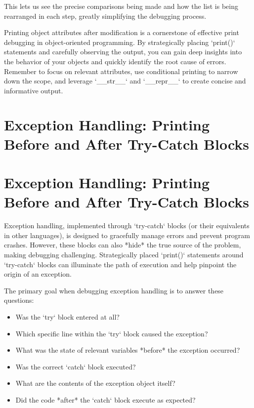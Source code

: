 \documentclass{article}
\begin{document}
{{{This lets us see the precise comparisons being made and how the list is being rearranged in each step, greatly simplifying the debugging process.

Printing object attributes after modification is a cornerstone of effective print debugging in object-oriented programming. By strategically placing `print()` statements and carefully observing the output, you can gain deep insights into the behavior of your objects and quickly identify the root cause of errors. Remember to focus on relevant attributes, use conditional printing to narrow down the scope, and leverage `__str__` and `__repr__` to create concise and informative output.

\newpage

\section*{Exception Handling: Printing Before and After Try-Catch Blocks} %
\label{chapter-3-5-Exception_Handling__Printing_Before_and}

\section*{Exception Handling: Printing Before and After Try-Catch Blocks}

Exception handling, implemented through `try-catch` blocks (or their equivalents in other languages), is designed to gracefully manage errors and prevent program crashes. However, these blocks can also *hide* the true source of the problem, making debugging challenging. Strategically placed `print()` statements around `try-catch` blocks can illuminate the path of execution and help pinpoint the origin of an exception.

The primary goal when debugging exception handling is to answer these questions:

\begin{itemize}
    \item Was the `try` block entered at all?
    \item Which specific line within the `try` block caused the exception?
    \item What was the state of relevant variables *before* the exception occurred?
    \item Was the correct `catch` block executed?
    \item What are the contents of the exception object itself?
    \item Did the code *after* the `catch` block execute as expected?
\end{itemize}

}}}
\end{document}

